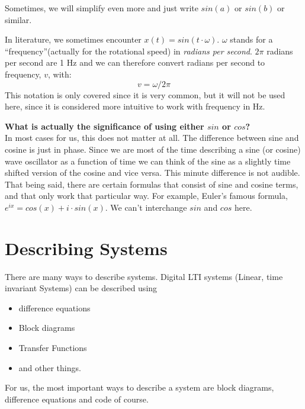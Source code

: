 Sometimes, we will simplify even more and just write $sin(a)$ or $sin(b)$ or similar.\\
\begin{mdframed}[backgroundcolor=black!10,rightline=false,leftline=false]
In literature, we sometimes encounter $x(t) = sin(t \cdot \omega)$. $\omega$ stands for a ``frequency''(actually for the rotational speed) in \textit{radians per second}. $2\pi$ radians per second are 1 Hz and we can therefore convert radians per second to frequency, $v$, with:
\begin{equation}
  	v = \omega / 2\pi
  \end{equation}
This notation is only covered since it is very common, but it will not be used here, since it is considered more intuitive to work with frequency in Hz.
\vspace{0.5cm}

\textbf{What is actually the significance of using either $sin$ or $cos$?}\\
In most cases for us, this does not matter at all. The difference between sine and cosine is just in phase. Since we are most of the time describing a sine (or cosine) wave oscillator as a function of time we can think of the sine as a slightly time shifted version of the cosine and vice versa. This minute difference is not audible. \\
That being said, there are certain formulas that consist of sine and cosine terms, and that only work that particular way. For example, Euler's famous formula, $e^{ix}=cos(x)+i\cdot sin(x)$. We can't interchange $sin$ and $cos$ here.


\end{mdframed}

\section{Describing Systems}
There are many ways to describe systems. Digital LTI systems (Linear, time invariant Systems) can be described using
\begin{itemize}
	\item difference equations
	\item Block diagrams
	\item Transfer Functions
	\item and other things.
\end{itemize}

For us, the most important ways to describe a system are block diagrams, difference equations and code of course.

